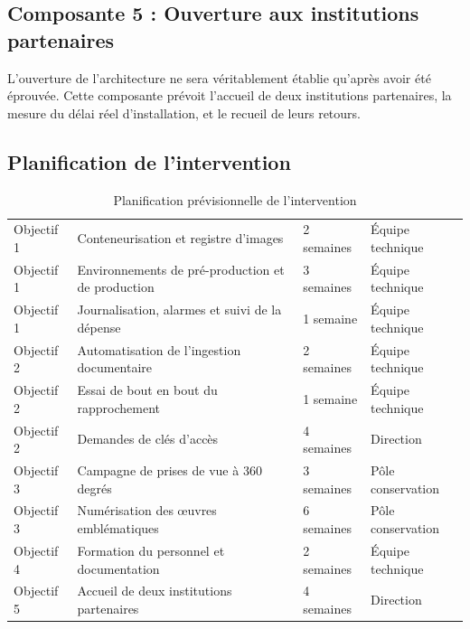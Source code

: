 \subsection{Composante 5 : Ouverture aux institutions partenaires}

L'ouverture de l'architecture ne sera véritablement établie qu'après avoir été
éprouvée. Cette composante prévoit l'accueil de deux institutions partenaires,
la mesure du délai réel d'installation, et le recueil de leurs retours.

\subsection{Planification de l'intervention}

\begin{table}[htbp]
\centering
\caption{Planification prévisionnelle de l'intervention}
\label{tab:planning}
\small
\begin{tabularx}{\textwidth}{|C{1.9cm}|X|C{2.2cm}|C{2.6cm}|}
\hline
{}
 &  &  &  \\ \hline
Objectif 1 & Conteneurisation et registre d'images & 2 semaines & Équipe technique \\ \hline
Objectif 1 & Environnements de pré-production et de production & 3 semaines & Équipe technique \\ \hline
Objectif 1 & Journalisation, alarmes et suivi de la dépense & 1 semaine & Équipe technique \\ \hline
Objectif 2 & Automatisation de l'ingestion documentaire & 2 semaines & Équipe technique \\ \hline
Objectif 2 & Essai de bout en bout du rapprochement & 1 semaine & Équipe technique \\ \hline
Objectif 2 & Demandes de clés d'accès & 4 semaines & Direction \\ \hline
Objectif 3 & Campagne de prises de vue à 360 degrés & 3 semaines & Pôle conservation \\ \hline
Objectif 3 & Numérisation des œuvres emblématiques & 6 semaines & Pôle conservation \\ \hline
Objectif 4 & Formation du personnel et documentation & 2 semaines & Équipe technique \\ \hline
Objectif 5 & Accueil de deux institutions partenaires & 4 semaines & Direction \\ \hline
\end{tabularx}
\end{table}


